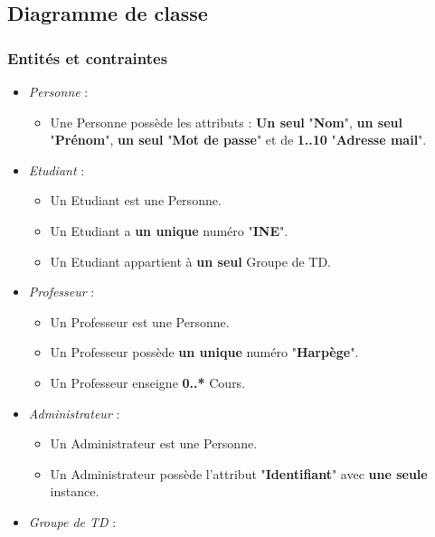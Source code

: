 \documentclass[a4paper, 11pt]{article}
\begin{document}
        \subsection{ Diagramme de classe}
        \subsubsection{ Entités et contraintes}
        \begin{itemize}
        \item \textit{Personne} :
                \begin{itemize}
                \item Une Personne possède les attributs : \textbf{Un seul} "\textbf{Nom}", \textbf{un seul} "\textbf{Prénom}", \textbf{un seul} "\textbf{Mot de passe}" et de \textbf{1..10} "\textbf{Adresse mail}".
                \end{itemize}
        \item \textit{Etudiant} :
                \begin{itemize}
                \item Un Etudiant est une Personne.
                \item Un Etudiant a \textbf{un unique} numéro "\textbf{INE}".
                \item Un Etudiant appartient à \textbf{un seul} Groupe de TD.
                \end{itemize}
        \item \textit{Professeur} :
                \begin{itemize}
                \item Un Professeur est une Personne.
                \item Un Professeur possède \textbf{un unique} numéro "\textbf{Harpège}".
                \item Un Professeur enseigne \textbf{0..*} Cours.
                \end{itemize}
        \item \textit{Administrateur} :
                \begin{itemize}
                \item Un Administrateur est une Personne.
                \item Un Administrateur possède l'attribut "\textbf{Identifiant}" avec \textbf{une seule} instance.
                \end{itemize}
        \item \textit{Groupe de TD} :

\end{itemize}
\end{document}
